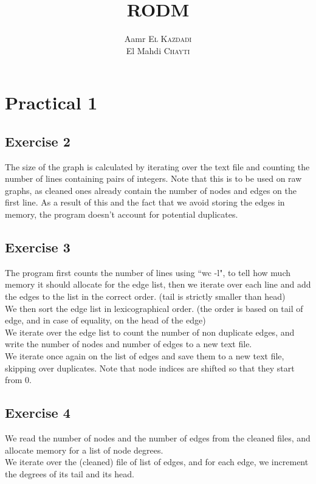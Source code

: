 \documentclass{article}
\begin{document}
\title{RODM}
\author{Aamr \textsc{El Kazdadi}\\
        El Mahdi \textsc{Chayti}}
\date{}
\maketitle
\section*{Practical 1}%
\subsection*{Exercise 2}%
\label{sub:tp1ex2}
The size of the graph is calculated by iterating over the text file and
counting the number of lines containing pairs of integers.
Note that this is to be used on raw graphs, as cleaned ones already contain the
number of nodes and edges on the first line.
As a result of this and the fact that we avoid storing the edges in memory, the
program doesn't account for potential duplicates.

\subsection*{Exercise 3}%
\label{sub:tp1ex3}
The program first counts the number of lines using ``wc -l", to tell how much
memory it should allocate for the edge list, then we iterate over each line
and add the edges to the list in the correct order.
(tail is strictly smaller than head)\\
We then sort the edge list in lexicographical order.
(the order is based on tail of edge, and in case of equality, on the head of the
edge)\\
We iterate over the edge list to count the number of non duplicate edges,
and write the number of nodes and number of edges to a new text file.\\
We iterate once again on the list of edges and save them to a new text file,
skipping over duplicates. Note that node indices are shifted so that they start
from 0.

\subsection*{Exercise 4}%
\label{sub:tp1ex4}
We read the number of nodes and the number of edges from the cleaned files, and
allocate memory for a list of node degrees.\\
We iterate over the (cleaned) file of list of edges, and for each edge, we
increment the degrees of its tail and its head.
\end{document}
